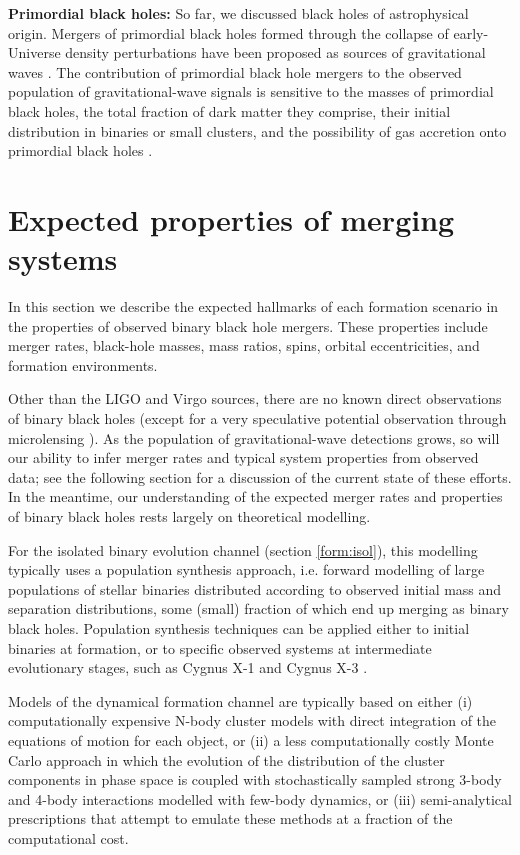 \documentclass[review]{elsarticle}
\begin{document}
\textbf{Primordial black holes:}  So far, we discussed black holes of astrophysical origin.   Mergers of primordial black holes formed through the collapse of early-Universe density perturbations have been proposed as sources of gravitational waves \citep{Bird:2016}.   The contribution of primordial black hole mergers to the observed population of gravitational-wave signals is sensitive to the masses of primordial black holes, the total fraction of dark matter they comprise, their initial distribution in binaries or small clusters, and the possibility of gas accretion onto primordial black holes \citep{AliHaimoud:2017, ChenHuang:2018, Korol:2019, DeLuca:2020b, DeLuca:2020a}.

\section{Expected properties of merging systems}\label{merge}

In this section we describe the expected hallmarks of each formation scenario in the properties of observed binary black hole mergers. These properties include merger rates, black-hole masses, mass ratios, spins, orbital eccentricities, and formation environments.

Other than the LIGO and Virgo sources, there are no known direct observations of binary black holes (except for a very speculative potential observation through microlensing \citep{Dong:2007}). As the population of gravitational-wave detections grows, so will our ability to infer merger rates and typical system properties from observed data; see the following section for a discussion of the current state of these efforts. In the meantime, our understanding of the expected merger rates and properties of binary black holes rests largely on theoretical modelling. 

For the isolated binary evolution channel (section \ref{form:isol}), this modelling typically uses a population synthesis approach, i.e. forward modelling of large populations of stellar binaries distributed according to observed initial mass and separation distributions, some (small) fraction of which end up merging as binary black holes. Population synthesis techniques can be applied either to initial binaries at formation, or to specific observed systems at intermediate evolutionary stages, such as Cygnus X-1 \citep{Bulik:2008,Neijssel:2020CygX1} and Cygnus X-3 \citep{CygnusX3:2012}.  

Models of the dynamical formation channel are typically based on either (i) computationally expensive N-body cluster models with direct integration of the equations of motion for each object, or (ii) a less computationally costly Monte Carlo approach in which the evolution of the distribution of the cluster components in phase space is coupled with stochastically sampled strong 3-body and 4-body interactions modelled with few-body dynamics, or (iii) semi-analytical prescriptions that attempt to emulate these methods at a fraction of the computational cost. 
\end{document}
